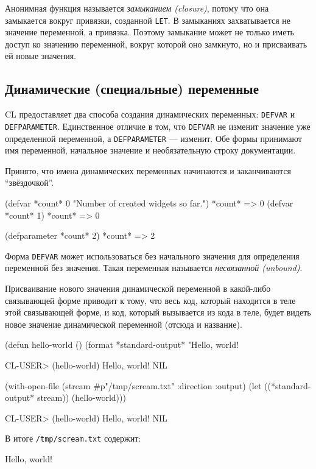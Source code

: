 Анонимная функция называется \emph{замыканием (closure)}, потому что она замыкается вокруг привязки, созданной \lstinline{LET}. В замыканиях захватывается не значение переменной, а привязка. Поэтому замыкание может не только иметь доступ ко значению переменной, вокруг которой оно замкнуто, но и присваивать ей новые значения.

\subsection{Динамические (специальные) переменные}
CL предоставляет два способа создания динамических переменных: \lstinline{DEFVAR} и \lstinline{DEFPARAMETER}. Единственное отличие в том, что \lstinline{DEFVAR} не изменит значение уже определенной переменной, а \lstinline{DEFPARAMETER} — изменит. Обе формы принимают имя переменной, начальное значение и необязательную строку документации.

Принято, что имена динамических переменных начинаются и заканчиваются ``звёздочкой''.
\begin{cllst}{}{}
(defvar *count* 0 "Number of created widgets so far.")
*count* => 0
(defvar *count* 1)
*count* => 0

(defparameter *count* 2)
*count* => 2
\end{cllst}

Форма \lstinline{DEFVAR} может использоваться без начального значения для определения переменной без значения. Такая переменная называется \emph{несвязанной (unbound)}.

Присваивание нового значения динамической переменной в какой-либо связывающей форме приводит к тому, что весь код, который находится в теле этой связывающей форме, и код, который вызывается из кода в теле, будет видеть новое значение динамической переменной (отсюда и название).
\begin{cllst}{}{}
(defun hello-world ()
  (format *standard-output* "Hello, world!~%

CL-USER> (hello-world)
Hello, world!
NIL

(with-open-file (stream #p"/tmp/scream.txt" :direction :output)
  (let ((*standard-output* stream))
    (hello-world)))

CL-USER> (hello-world)
Hello, world!
NIL
\end{cllst}

В итоге \texttt{/tmp/scream.txt} содержит:
\begin{plainlst}{}{}
Hello, world!
\end{plainlst}

